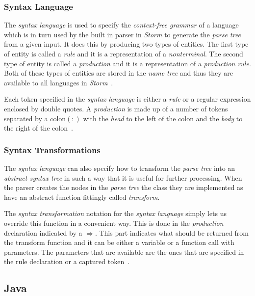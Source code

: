 \documentclass{sigchi}
\begin{document}
\subsubsection{Syntax Language}
The \emph{syntax language} is used to specify the \emph{context-free grammar} of a language which is in turn used by the built in parser in \emph{Storm} to generate the \emph{parse tree} from a given input. It does this by producing two types of entities. The first type of entity is called a \emph{rule} and it is a representation of a \emph{nonterminal}. The second type of entity is called a \emph{production} and it is a representation of a \emph{production rule}. Both of these types of entities are stored in the \emph{name tree} and thus they are available to all languages in \emph{Storm}~\cite{Storm:2023}.

Each token specified in the \emph{syntax language} is either a \emph{rule} or a regular expression enclosed by double quotes. A \emph{production} is made up of a number of tokens separated by a colon$(:)$ with the \emph{head} to the left of the colon and the \emph{body} to the right of the colon~\cite{Storm:2023}.


\subsubsection{Syntax Transformations}
The \emph{syntax language} can also specify how to transform the \emph{parse tree} into an \emph{abstract syntax tree} in such a way that it is useful for further processing. When the parser creates the nodes in the \emph{parse tree} the class they are implemented as have an abstract function fittingly called \emph{transform}.

The \emph{syntax transformation} notation for the \emph{syntax language} simply lets us override this function in a convenient way. This is done in the \emph{production} declaration indicated by a $\Rightarrow$. This part indicates what should be returned from the transform function and it can be either a variable or a function call with parameters. The parameters that are available are the ones that are specified in the rule declaration or a captured token~\cite{Storm:2023}.


\subsection{Java}
\end{document}
